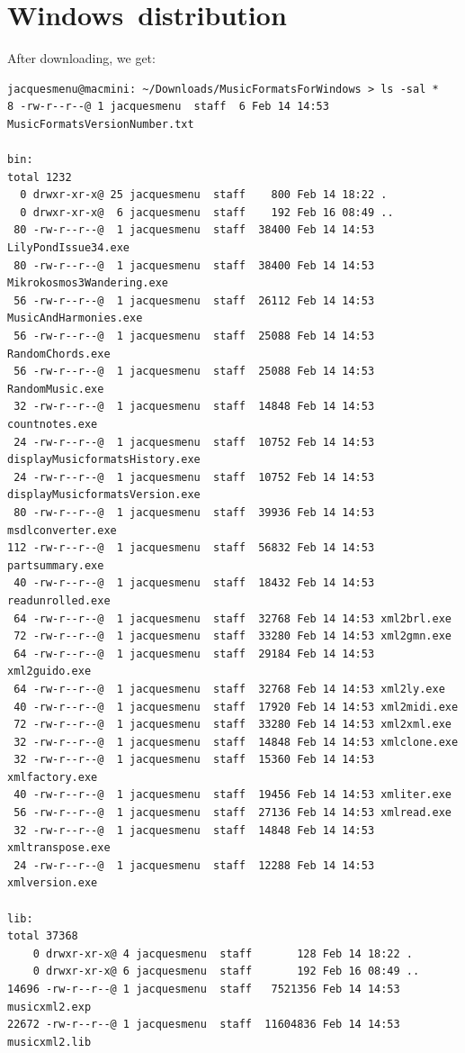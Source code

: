 \section{Windows\texttrademark\ distribution}

After downloading, we get:
\begin{lstlisting}[language=Terminal]
jacquesmenu@macmini: ~/Downloads/MusicFormatsForWindows > ls -sal *
8 -rw-r--r--@ 1 jacquesmenu  staff  6 Feb 14 14:53 MusicFormatsVersionNumber.txt

bin:
total 1232
  0 drwxr-xr-x@ 25 jacquesmenu  staff    800 Feb 14 18:22 .
  0 drwxr-xr-x@  6 jacquesmenu  staff    192 Feb 16 08:49 ..
 80 -rw-r--r--@  1 jacquesmenu  staff  38400 Feb 14 14:53 LilyPondIssue34.exe
 80 -rw-r--r--@  1 jacquesmenu  staff  38400 Feb 14 14:53 Mikrokosmos3Wandering.exe
 56 -rw-r--r--@  1 jacquesmenu  staff  26112 Feb 14 14:53 MusicAndHarmonies.exe
 56 -rw-r--r--@  1 jacquesmenu  staff  25088 Feb 14 14:53 RandomChords.exe
 56 -rw-r--r--@  1 jacquesmenu  staff  25088 Feb 14 14:53 RandomMusic.exe
 32 -rw-r--r--@  1 jacquesmenu  staff  14848 Feb 14 14:53 countnotes.exe
 24 -rw-r--r--@  1 jacquesmenu  staff  10752 Feb 14 14:53 displayMusicformatsHistory.exe
 24 -rw-r--r--@  1 jacquesmenu  staff  10752 Feb 14 14:53 displayMusicformatsVersion.exe
 80 -rw-r--r--@  1 jacquesmenu  staff  39936 Feb 14 14:53 msdlconverter.exe
112 -rw-r--r--@  1 jacquesmenu  staff  56832 Feb 14 14:53 partsummary.exe
 40 -rw-r--r--@  1 jacquesmenu  staff  18432 Feb 14 14:53 readunrolled.exe
 64 -rw-r--r--@  1 jacquesmenu  staff  32768 Feb 14 14:53 xml2brl.exe
 72 -rw-r--r--@  1 jacquesmenu  staff  33280 Feb 14 14:53 xml2gmn.exe
 64 -rw-r--r--@  1 jacquesmenu  staff  29184 Feb 14 14:53 xml2guido.exe
 64 -rw-r--r--@  1 jacquesmenu  staff  32768 Feb 14 14:53 xml2ly.exe
 40 -rw-r--r--@  1 jacquesmenu  staff  17920 Feb 14 14:53 xml2midi.exe
 72 -rw-r--r--@  1 jacquesmenu  staff  33280 Feb 14 14:53 xml2xml.exe
 32 -rw-r--r--@  1 jacquesmenu  staff  14848 Feb 14 14:53 xmlclone.exe
 32 -rw-r--r--@  1 jacquesmenu  staff  15360 Feb 14 14:53 xmlfactory.exe
 40 -rw-r--r--@  1 jacquesmenu  staff  19456 Feb 14 14:53 xmliter.exe
 56 -rw-r--r--@  1 jacquesmenu  staff  27136 Feb 14 14:53 xmlread.exe
 32 -rw-r--r--@  1 jacquesmenu  staff  14848 Feb 14 14:53 xmltranspose.exe
 24 -rw-r--r--@  1 jacquesmenu  staff  12288 Feb 14 14:53 xmlversion.exe

lib:
total 37368
    0 drwxr-xr-x@ 4 jacquesmenu  staff       128 Feb 14 18:22 .
    0 drwxr-xr-x@ 6 jacquesmenu  staff       192 Feb 16 08:49 ..
14696 -rw-r--r--@ 1 jacquesmenu  staff   7521356 Feb 14 14:53 musicxml2.exp
22672 -rw-r--r--@ 1 jacquesmenu  staff  11604836 Feb 14 14:53 musicxml2.lib
\end{lstlisting}

